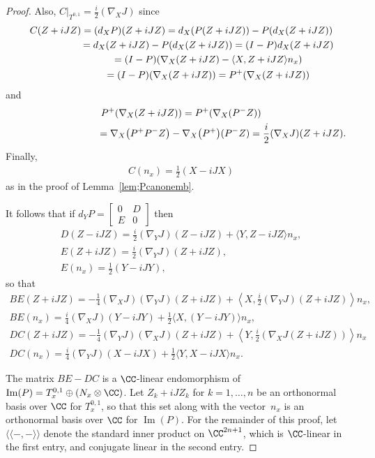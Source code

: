 \begin{proof}
Also, $C \big|_{T^{0,1}} = \frac{i}{ 2} (\nabla_X J) $ since
\begin{gather*}
C(Z+iJZ) = (d_X P)(Z+iJZ) = d_X(P(Z + iJZ)) - P(d_X(Z+iJZ)) \\
\hphantom{C(Z+iJZ)}{} =d_X(Z + iJZ) - P(d_X(Z+iJZ)) = (I-P)d_X (Z+iJZ) \\
\hphantom{C(Z+iJZ)}{} = (I-P) ( \nabla_X (Z+iJZ) - \langle X,Z + iJZ \rangle n_x ) \\
\hphantom{C(Z+iJZ)}{} =(I-P) ( \nabla_X (Z+iJZ) ) = P^+ ( \nabla_X (Z+iJZ))
\end{gather*}
and
\begin{gather*}
 P^+ ( \nabla_X (Z+iJZ) ) = P^+ ( \nabla_X (P^- Z) ) \\
 \hphantom{P^+ ( \nabla_X (Z+iJZ) )}{} = \nabla_X \big( P^+ P^- Z\big)- \nabla_X\big(P^+\big) (P^-Z) = \frac{i}{2} (\nabla_X J) (Z + i J Z).
 \end{gather*}
 Finally,
\begin{gather*}
C(n_x) = \frac 1 2 (X - i J X)
\end{gather*}
as in the proof of Lemma~\ref{lem;Pcanonemb}.

It follows that if $d_YP =\left[
\begin{smallmatrix}
0 & D \\
E& 0
\end{smallmatrix}\right]$ then
\begin{gather*}
D(Z-iJZ) = \frac i 2 (\nabla_Y J) (Z-iJZ) + \langle Y , Z-iJZ \rangle n_x, \\
E (Z+iJZ) = \frac{i}{ 2} (\nabla_Y J)(Z+iJZ) ,\\
E(n_x) = \frac 1 2 (Y - i J Y),
\end{gather*}
so that
\begin{gather*}
BE (Z+iJZ) = -\frac{1}{4} (\nabla_X J) (\nabla_Y J)(Z+iJZ) + \left\langle X , \frac{i}{ 2} (\nabla_Y J)(Z+iJZ) \right\rangle n_x, \\
BE(n_x) = \frac i 4 (\nabla_X J) (Y - i J Y) + \frac 1 2 \langle X , (Y - i J Y) \rangle n_x, \\
DC(Z+iJZ) = -\frac{1}{4} (\nabla_Y J) (\nabla_X J)(Z+iJZ) + \left\langle Y , \frac{i}{ 2} ( \nabla_X J (Z+iJZ)) \right\rangle n_x \\
DC(n_x) = \frac i 4 (\nabla_Y J) (X-iJX) + \frac 1 2\langle Y , X-iJX \rangle n_x.
\end{gather*}

The matrix $BE-DC$ is a $\CC$-linear endomorphism of $\operatorname{Im}(P) = T^{0,1}_x \oplus (N_x \otimes \CC)$. Let $Z_k + i J Z_k$ for $k=1,\ldots ,n$ be an orthonormal basis over $\CC$ for $T^{0,1}_x$, so that this set along with the vector~$n_x$ is an orthonormal basis over $\CC$ for $\operatorname{Im}(P)$. For the remainder of this proof, let $\langle\langle - , - \rangle\rangle $ denote the standard inner product on $\CC^{2n+1}$, which is $\CC$-linear in the first entry, and conjugate linear in the second entry.


\end{proof}
